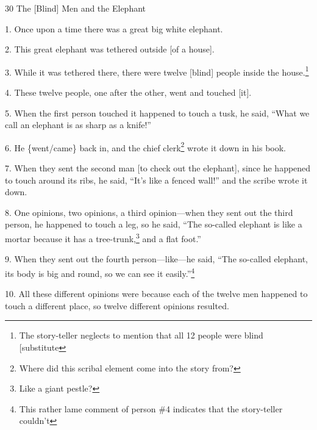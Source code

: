 
30 The [Blind] Men and the Elephant

1. Once upon a time there was a great big white elephant.

2. This great elephant was tethered outside [of a house].

3. While it was tethered there, there were twelve [blind] people inside the house.\footnote{The story-teller neglects to mention that all 12 people were blind [substitute}

4. These twelve people, one after the other, went and touched [it].

5. When the first person touched it happened to touch a tusk, he said, ``What we
call an elephant is as sharp as a knife!''

6. He \{went/came\} back in, and the chief clerk\footnote{Where did this scribal element come into the story from?} wrote it down in his book.

7. When they sent the second man [to check out the elephant], since he happened
to touch around its ribs, he said, ``It's like a fenced wall!'' and the scribe
wrote it down.

8. One opinions, two opinions, a third opinion---when they sent out the third person,
he happened to touch a leg, so he said, ``The so-called elephant is like a mortar
because it has a tree-trunk,\footnote{Like a giant pestle?} and a flat foot.''

9. When they sent out the fourth person---like---he said, ``The so-called elephant,
its body is big and round, so we can see it easily.''\footnote{This rather lame comment of person \#4 indicates that the story-teller couldn't}

10. All these different opinions were because each of the twelve men happened to
touch a different place, so twelve different opinions resulted.

